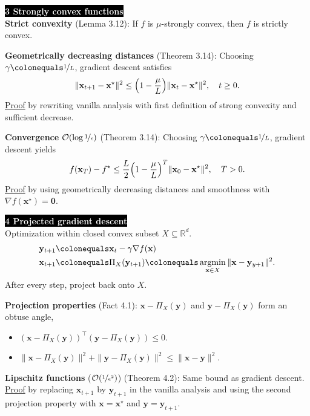 \documentclass{article}
\DeclareMathOperator*{\argmin}{argmin}
\newcommand{\lft}{\mathopen{}\mathclose\bgroup\left}
\newcommand{\rgt}{\aftergroup\egroup\right}
\newcommand{\R}{\mathbb{R}}
\renewcommand{\vec}[1]{\mathbf{#1}}
\newcommand{\transpose}[1]{#1^\top}
\newenvironment{topic}[1]
{\textbf{\sffamily \colorbox{black}{\textcolor{white}{#1}}} \\ \vspace{0.2cm}}
{}
\begin{document}
\begin{multicols*}{3}
\begin{topic}{3 Strongly convex functions}
        \textbf{Strict convexity} (Lemma 3.12): If $f$ is $\mu$-strongly convex, then $f$ is strictly convex.

        \textbf{Geometrically decreasing distances} (Theorem 3.14): Choosing $\gamma \colonequals \nicefrac{1}{L}$, gradient descent satisfies \[
            \| \vec{x}_{t+1} - \vec{x}^\star \|^2 \leq \lft( 1 - \frac{\mu}{L} \rgt) \| \vec{x}_t - \vec{x}^\star \|^2, \quad t \geq 0.
        \]
        \underline{Proof} by rewriting vanilla analysis with first definition of strong convexity and
        sufficient decrease.

        \textbf{Convergence} $\mathcal{O}(\log \nicefrac{1}{\epsilon})$ (Theorem 3.14): Choosing $\gamma \colonequals \nicefrac{1}{L}$, gradient descent yields \[
            f(\vec{x}_T) - f^\star \leq \frac{L}{2} \lft( 1 - \frac{\mu}{L} \rgt)^T \| \vec{x}_0 - \vec{x}^\star \|^2, \quad T > 0.
        \]
        \underline{Proof} by using geometrically decreasing distances and smoothness with
        $\nabla f(\vec{x}^\star) = \vec{0}$.
    \end{topic}

    \begin{topic}{4 Projected gradient descent}
        Optimization within closed convex subset $X \subseteq \R^d$.
        \begin{align*}
            \vec{y}_{t+1} & \colonequals \vec{x}_t - \gamma \nabla f(\vec{x})                                                       \\
            \vec{x}_{t+1} & \colonequals \Pi_X(\vec{y}_{t+1}) \colonequals \argmin_{\vec{x} \in X} \| \vec{x} - \vec{y}_{y+1} \|^2.
        \end{align*}
        After every step, project back onto $X$.

        \textbf{Projection properties} (Fact 4.1): $\vec{x} - \Pi_X(\vec{y})$ and $\vec{y} - \Pi_X(\vec{y})$ form an obtuse angle,
        \begin{itemize}
            \item $\transpose{(\vec{x} - \Pi_X(\vec{y}))}(\vec{y} - \Pi_X(\vec{y})) \leq 0$.
            \item $\| \vec{x} - \Pi_X(\vec{y}) \|^2 + \| \vec{y} - \Pi_X(\vec{y}) \|^2 \leq \| \vec{x} - \vec{y} \|^2$.
        \end{itemize}

        \textbf{Lipschitz functions} ($\mathcal{O}(\nicefrac{1}{\epsilon^2})$) (Theorem 4.2): Same bound as gradient
        descent. \underline{Proof} by replacing $\vec{x}_{t+1}$ by $\vec{y}_{t+1}$ in the vanilla
        analysis and using the second projection property with $\vec{x} = \vec{x}^\star$ and
        $\vec{y} = \vec{y}_{t+1}$.


\end{topic}
\end{multicols*}
\end{document}
